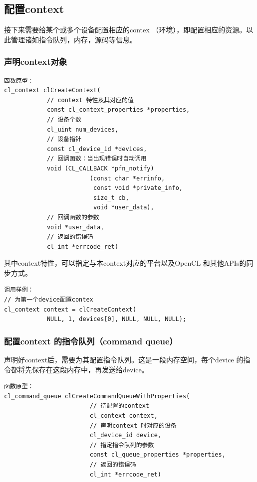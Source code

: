 \documentclass{ctexart}
\begin{document}
\subsection{配置context}
接下来需要给某个或多个设备配置相应的contex （环境），即配置相应的资源。以此管理诸如指令队列，内存，源码等信息。

\subsubsection{声明context对象}
\begin{verbatim}
函数原型：
cl_context clCreateContext(
            // context 特性及其对应的值
            const cl_context_properties *properties,
            // 设备个数
            cl_uint num_devices,
            // 设备指针
            const cl_device_id *devices,
            // 回调函数：当出现错误时自动调用
            void (CL_CALLBACK *pfn_notify)
                        (const char *errinfo,
                         const void *private_info,
                         size_t cb,
                         void *user_data),
            // 回调函数的参数
            void *user_data,
            // 返回的错误码
            cl_int *errcode_ret)
\end{verbatim}

其中context特性，可以指定与本context对应的平台以及OpenCL 和其他APIs的同步方式。

\begin{verbatim}
调用样例：
// 为第一个device配置contex
cl_context context = clCreateContext(
            NULL, 1, devices[0], NULL, NULL, NULL);
\end{verbatim}



\subsubsection{配置context 的指令队列（command queue）}
声明好context后，需要为其配置指令队列。这是一段内存空间，每个device 的指令都将先保存在这段内存中，再发送给device。
\begin{verbatim}
函数原型：
cl_command_queue clCreateCommandQueueWithProperties(
                        // 待配置的context
                        cl_context context,
                        // 声明context 时对应的设备
                        cl_device_id device,
                        // 指定指令队列的参数
                        const cl_queue_properties *properties,
                        // 返回的错误码
                        cl_int *errcode_ret)
\end{verbatim}
\end{document}
